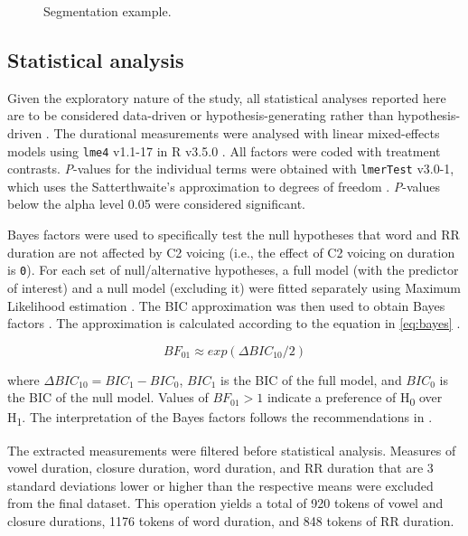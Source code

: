 \documentclass[preprint]{JASAnew}
\begin{document}
\begin{figure}
  \caption{Segmentation example.}
  \label{f:segmentation}
\end{figure}

\hypertarget{statistical-analysis}{%
\subsection{Statistical analysis}\label{statistical-analysis}}

Given the exploratory nature of the study, all statistical analyses
reported here are to be considered data-driven or hypothesis-generating
rather than hypothesis-driven \citep{kerr1998, gelman2013}. The
durational measurements were analysed with linear mixed-effects models
using \texttt{lme4} v1.1-17 in R v3.5.0
\citep{r-core-team2018, bates2015}. All factors were coded with
treatment contrasts. \emph{P}-values for the individual terms were
obtained with \texttt{lmerTest} v3.0-1, which uses the Satterthwaite's
approximation to degrees of freedom \citep{kuznetsova2017, luke2017}.
\emph{P}-values below the alpha level 0.05 were considered significant.

Bayes factors were used to specifically test the null hypotheses that
word and RR duration are not affected by C2 voicing (i.e., the effect of
C2 voicing on duration is \texttt{0}). For each set of null/alternative
hypotheses, a full model (with the predictor of interest) and a null
model (excluding it) were fitted separately using Maximum Likelihood
estimation \citep[p.~34]{bates2015}. The BIC approximation was then used
to obtain Bayes factors
\citep{raftery1995, raftery1999, wagenmakers2007, jarosz2014}. The
approximation is calculated according to the equation in \ref{eq:bayes}
\citep[p.~796]{wagenmakers2007}.

\begin{equation}
\label{eq:bayes}
BF_{01} \approx exp(\Delta{}BIC_{10}/2)
\end{equation}

where \(\Delta{}BIC_{10} = BIC_1 - BIC_0\), \(BIC_1\) is the BIC of the
full model, and \(BIC_0\) is the BIC of the null model. Values of
\(BF_{01} > 1\) indicate a preference of H\textsubscript{0} over
H\textsubscript{1}. The interpretation of the Bayes factors follows the
recommendations in \citet[p.~139]{raftery1995}.

The extracted measurements were filtered before statistical analysis.
Measures of vowel duration, closure duration, word duration, and RR
duration that are 3 standard deviations lower or higher than the
respective means were excluded from the final dataset. This operation
yields a total of 920 tokens of vowel and closure durations, 1176 tokens
of word duration, and 848 tokens of RR duration.
\end{document}
